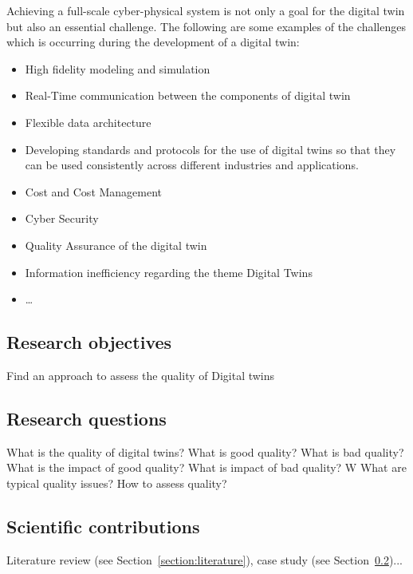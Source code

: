 \documentclass[9pt,conference]{IEEEtran}
\begin{document}
    Achieving a full-scale cyber-physical system is not only a goal for the digital twin but also an essential challenge. The following are some examples of the challenges which is occurring during the development of a digital twin:
    \begin{itemize}
        \item High fidelity modeling and simulation
        \item Real-Time communication between the components of digital twin 
        \item Flexible data architecture
        \item Developing standards and protocols for the use of digital twins so that they can be used consistently across different industries and applications.
        \item Cost and Cost Management
        \item Cyber Security
        \item Quality Assurance of the digital twin
        \item Information inefficiency regarding the theme Digital Twins
        \item \dots{}
    \end{itemize}
    
    \subsection{Research objectives}
    
    Find an approach to assess the quality of Digital twins

    \subsection{Research questions}
    \label{section:Research Questions}

    What is the quality of digital twins? 
    What is good quality?
    What is bad quality? 
    What is the impact of good quality? 
    What is impact of bad quality? W
    What are typical quality issues? 
    How to assess quality?

    \subsection{Scientific contributions}

    Literature review (see Section~\ref{section:literature}), case study (see Section~\ref{section:Research Questions})...
    
\end{document}
